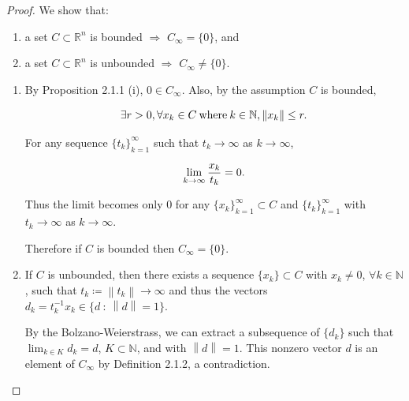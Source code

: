 \documentclass[a4paper,11pt]{jsarticle}
\newcommand{\NaturalNumberSet}{\mathbb{N}}
\newcommand{\NDemenstionalRealEuclidianSpace}{\mathbb{R}^n}
\begin{document}
\begin{proof}
  We show that:

  \begin{enumerate}[label=\roman*,align=CenterWithParen]
    \item a set $C \subset \NDemenstionalRealEuclidianSpace$ is bounded $\Rightarrow $ $C_{\infty} = \{0\}$, and
    \item a set $C \subset \NDemenstionalRealEuclidianSpace$ is unbounded $\Rightarrow $ $C_{\infty} \ne \{0\}$.
  \end{enumerate}

  \begin{enumerate}[label=\roman*,align=CenterWithParen]
    \item By Proposition 2.1.1 (i), $0 \in C_{\infty}$. Also, by the assumption $C$ is bounded,

    \begin{equation}
      \exists r > 0, \forall x_k \in C \:\text{where}\: k \in \NaturalNumberSet,  \left\lVert x_k \right\rVert \leq r. \notag
    \end{equation}

    For any sequence $\{t_k\}_{k=1}^{\infty}$ such that $t_k \rightarrow \infty$ as $k \rightarrow \infty$,

    \begin{equation}
      \lim_{k \to \infty} \frac{x_k}{t_k} = 0. \notag
    \end{equation}

    Thus the limit becomes only 0 for any $\{x_k\}_{k=1}^{\infty} \subset C$ and $\{t_k\}_{k=1}^{\infty}$ with $t_k \rightarrow \infty$ as $k \rightarrow \infty$.

    Therefore if $C$ is bounded then $C_{\infty} = \{0\}$.

    \item If $C$ is unbounded, then there exists a sequence $\{x_k\} \subset C$ with $x_k \ne 0$, $\forall k \in \NaturalNumberSet$, such that $t_k \coloneqq \left\lVert t_k \right\rVert \rightarrow \infty$ and thus the vectors $d_k = t_k^{-1} x_k \in \{ d \:\colon\: \left\lVert d\right\rVert = 1 \}$.

    By the Bolzano-Weierstrass, we can extract a subsequence of $\{d_k\}$ such that $\lim_{k \in K} d_k = d$, $K \subset \NaturalNumberSet$, and with $\left\lVert d \right\rVert = 1$. This nonzero vector $d$ is an element of $C_{\infty}$ by Definition 2.1.2, a contradiction.
  \end{enumerate}
\end{proof}
\end{document}
